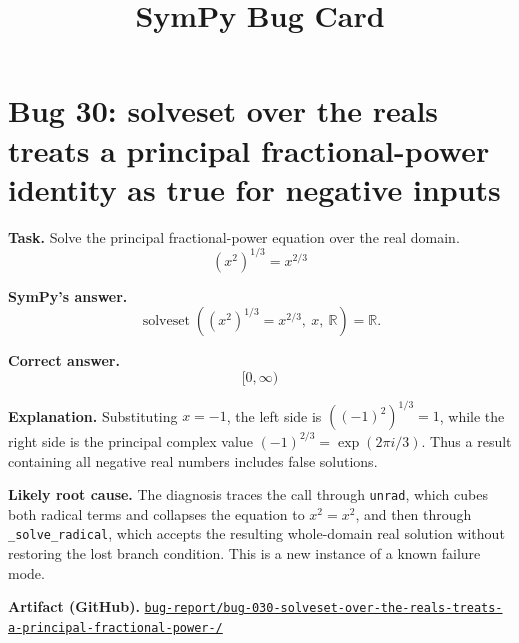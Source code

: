 \documentclass[11pt]{article}
\title{SymPy Bug Card}
\author{}
\date{}
\newcommand{\artifactrepo}{https://github.com/TODO-org/TODO-repo}
\newcommand{\bugbundle}[1]{\href{\artifactrepo/tree/main/bug-report/#1}{\nolinkurl{bug-report/#1/}}}
\begin{document}
\maketitle

\section*{Bug 30: solveset over the reals treats a principal fractional-power identity as true for negative inputs}

\begin{counterexamplebox}
\textbf{Task.} Solve the principal fractional-power equation over the real domain.
\[
  (x^2)^{1/3}=x^{2/3}
\]

\medskip
\textbf{SymPy's answer.}
\[
  \operatorname{solveset}\!\left((x^2)^{1/3}=x^{2/3},\ x,\ \mathbb{R}\right)=\mathbb{R}.
\]

\medskip
\textbf{Correct answer.}
\[
  [0,\infty)
\]

\medskip
\textbf{Explanation.} Substituting \(x=-1\), the left side is \(((-1)^2)^{1/3}=1\), while the right side is the principal complex value \((-1)^{2/3}=\exp(2\pi i/3)\).  Thus a result containing all negative real numbers includes false solutions.

\medskip
\textbf{Likely root cause.} The diagnosis traces the call through \texttt{unrad}, which cubes both radical terms and collapses the equation to \(x^2=x^2\), and then through \texttt{\_solve\_radical}, which accepts the resulting whole-domain real solution without restoring the lost branch condition.  This is a new instance of a known failure mode.

\medskip
\textbf{Artifact (GitHub).} \bugbundle{bug-030-solveset-over-the-reals-treats-a-principal-fractional-power-}
\end{counterexamplebox}
\end{document}
